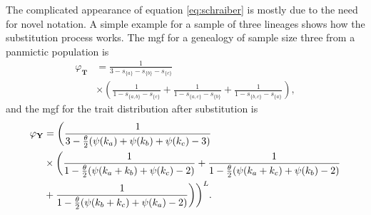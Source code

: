 The complicated appearance of equation \eqref{eq:schraiber} is mostly due to the
need for novel notation. A simple example for a sample of three lineages shows
how the substitution process works. The mgf for a genealogy of sample size three
from a panmictic population is
\begin{align*}
  \varphi_{\mathbf{T}} &= \frac{1}{3 - s_{\{a\}} - s_{\{b\}} - s_{\{c\}}} \\
  &\times \left( \frac{1}{1 - s_{\{a,b\}} - s_{\{c\}}} + \frac{1}{1 - s_{\{a,c\}} - s_{\{b\}}}  + \frac{1}{1 - s_{\{b,c\}} - s_{\{a\}}}\right),
    \end{align*}
and the mgf for the trait distribution after substitution is
\begin{align*}
  \varphi_{\mathbf{Y}} &= \biggl(\frac{1}{3 - \frac{\theta}{2}(\psi(k_a) + \psi(k_b) + \psi(k_c) - 3)} \\
  &\times \biggl( \frac{1}{1 - \frac{\theta}{2}(\psi(k_a+k_b) + \psi(k_c) - 2)} +
  \frac{1}{1 - \frac{\theta}{2}(\psi(k_a+k_c) + \psi(k_b) - 2)} \\
  &+\frac{1}{1 - \frac{\theta}{2}(\psi(k_b+k_c) + \psi(k_a) - 2)}\biggr)
  \biggr)^L.
\end{align*}
